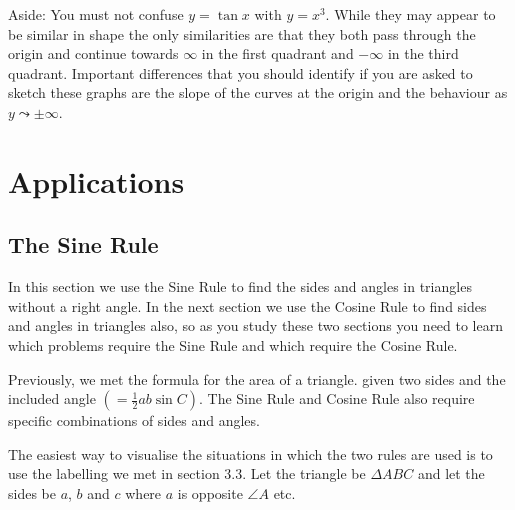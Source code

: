 Aside: You must not confuse $y =\tan  x$ with $y =x^{3}$. While they may appear to be similar in shape the only similarities are that they both pass through the origin and continue towards $\infty $ in the first quadrant and $ -\infty $ in the third quadrant. Important differences that you should identify if you are asked to sketch these graphs are the slope of the curves at the origin and the behaviour as $y \leadsto  \pm \infty $. 

\section{Applications}\label{sec:applications}
\subsection{The Sine Rule}
In this section we use the Sine Rule to find the sides and angles in triangles without a right angle. In the next section we use the Cosine Rule to find sides and angles in triangles also, so as you study these two sections you need to learn which problems require the Sine Rule and which require the Cosine Rule. 

Previously, we met the formula for the area of a triangle. given two sides and the included angle $\left ( =\frac{1}{2} a b \sin  C\right )$. The Sine Rule and Cosine Rule also require specific combinations of sides and angles. 

The easiest way to visualise the situations in which the two rules are used is to use the labelling we met in section $3.3$. Let the triangle be $ \Delta A B C$ and let the sides be $a$, $b$ and $c$ where $a$ is opposite $\angle A$ etc. 

\setlength\fboxrule{0in}\setlength\fboxsep{0.2in}

